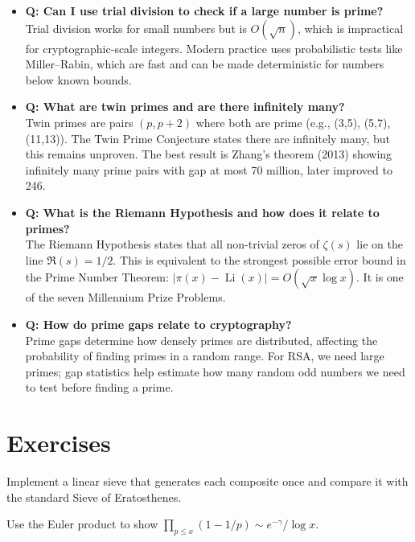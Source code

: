 \begin{itemize}
\item \textbf{Q: Can I use trial division to check if a large number is prime?} \\
Trial division works for small numbers but is $O(\sqrt{n})$, which is impractical for cryptographic-scale integers. Modern practice uses probabilistic tests like Miller--Rabin, which are fast and can be made deterministic for numbers below known bounds.

\item \textbf{Q: What are twin primes and are there infinitely many?} \\
Twin primes are pairs $(p, p+2)$ where both are prime (e.g., (3,5), (5,7), (11,13)). The Twin Prime Conjecture states there are infinitely many, but this remains unproven. The best result is Zhang's theorem (2013) showing infinitely many prime pairs with gap at most 70 million, later improved to 246.

\item \textbf{Q: What is the Riemann Hypothesis and how does it relate to primes?} \\
The Riemann Hypothesis states that all non-trivial zeros of $\zeta(s)$ lie on the line $\Re(s) = 1/2$. This is equivalent to the strongest possible error bound in the Prime Number Theorem: $|\pi(x) - \operatorname{Li}(x)| = O(\sqrt{x} \log x)$. It is one of the seven Millennium Prize Problems.

\item \textbf{Q: How do prime gaps relate to cryptography?} \\
Prime gaps determine how densely primes are distributed, affecting the probability of finding primes in a random range. For RSA, we need large primes; gap statistics help estimate how many random odd numbers we need to test before finding a prime.
\end{itemize}

\section{Exercises}

\begin{exercise}
Implement a linear sieve that generates each composite once and compare it with the standard Sieve of Eratosthenes.
\end{exercise}

\begin{exercise}
Use the Euler product to show $\prod_{p \le x} (1 - 1/p) \sim e^{-\gamma}/\log x$.
\end{exercise}

